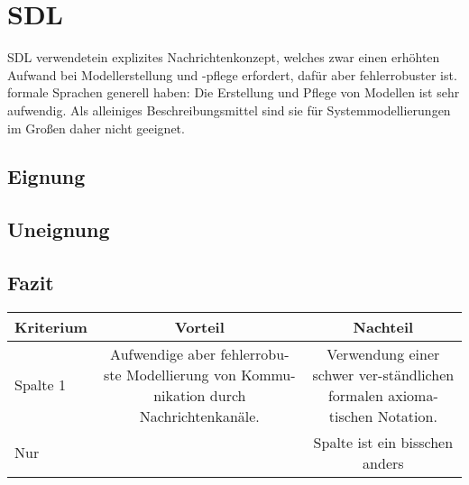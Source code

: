\section{SDL}
\label{sc:SDLB}
SDL verwendetein  explizites  Nachrichtenkonzept,  welches  zwar  einen  erhöhten  Aufwand  bei  Modellerstellung und -pflege erfordert, dafür aber fehlerrobuster ist. 
formale Sprachen generell haben: Die Erstellung und Pflege von Modellen ist sehr aufwendig. Als alleiniges Beschreibungsmittel sind sie für Systemmodellierungen im Großen daher nicht geeignet.
\subsection{Eignung}

\subsection{Uneignung}

\subsection{Fazit}

\begin{tabular}{|l|c|c|}
	\hline
	Kriterium & Vorteil & Nachteil  \\
	\hline
	Spalte 1 & Aufwendige aber fehlerrobu-ste Modellierung von Kommu-nikation durch Nachrichtenkanäle. & Verwendung einer schwer ver-ständlichen formalen axioma-tischen Notation. & \\
	\hline
	Nur &  & Spalte ist ein bisschen anders \\
	\hline
	\hline
\end{tabular}